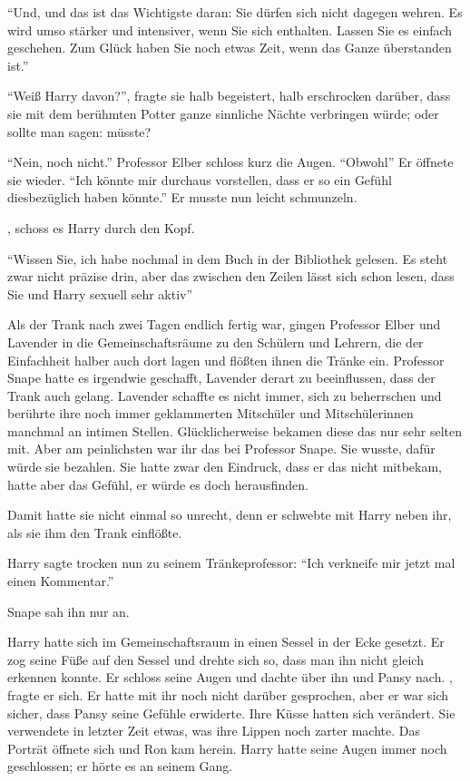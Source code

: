\enquote{Und, und das ist das Wichtigste daran: Sie dürfen sich nicht dagegen wehren. Es wird umso stärker und intensiver, wenn Sie sich enthalten. Lassen Sie es einfach geschehen. Zum Glück haben Sie noch etwas Zeit, wenn das Ganze überstanden ist.}

\enquote{Weiß Harry davon?}, fragte sie halb begeistert, halb erschrocken darüber, dass sie mit dem berühmten Potter ganze sinnliche Nächte verbringen würde; oder sollte man sagen: müsste?

\enquote{Nein, noch nicht.} Professor Elber schloss kurz die Augen. \enquote{Obwohl\abs} Er öffnete sie wieder. \enquote{Ich könnte mir durchaus vorstellen, dass er so ein Gefühl diesbezüglich haben könnte.} Er musste nun leicht schmunzeln.

, schoss es Harry durch den Kopf. 

\enquote{Wissen Sie, ich habe nochmal in dem Buch in der Bibliothek gelesen. Es steht zwar nicht präzise drin, aber das zwischen den Zeilen lässt sich schon lesen, dass Sie und Harry sexuell sehr aktiv\abs}

Als der Trank nach zwei Tagen endlich fertig war, gingen Professor Elber und Lavender in die Gemeinschaftsräume zu den Schülern und Lehrern, die der Einfachheit halber auch dort lagen und flößten ihnen die Tränke ein. Professor Snape hatte es irgendwie geschafft, Lavender derart zu beeinflussen, dass der Trank auch gelang. Lavender schaffte es nicht immer, sich zu beherrschen und berührte ihre noch immer geklammerten Mitschüler und Mitschülerinnen manchmal an intimen Stellen. Glücklicherweise bekamen diese das nur sehr selten mit. Aber am peinlichsten war ihr das bei Professor Snape. Sie wusste, dafür würde sie bezahlen. Sie hatte zwar den Eindruck, dass er das nicht mitbekam, hatte aber das Gefühl, er würde es doch herausfinden.

Damit hatte sie nicht einmal so unrecht, denn er schwebte mit Harry neben ihr, als sie ihm den Trank einflößte.

Harry sagte trocken nun zu seinem Tränkeprofessor: \enquote{Ich verkneife mir jetzt mal einen Kommentar.}

Snape sah ihn nur an.

\trenn

Harry hatte sich im Gemeinschaftsraum in einen Sessel in der Ecke gesetzt. Er zog seine Füße auf den Sessel und drehte sich so, dass man ihn nicht gleich erkennen konnte. Er schloss seine Augen und dachte über ihn und Pansy nach. , fragte er sich. Er hatte mit ihr noch nicht darüber gesprochen, aber er war sich sicher, dass Pansy seine Gefühle erwiderte. Ihre Küsse hatten sich verändert. Sie verwendete in letzter Zeit etwas, was ihre Lippen noch zarter machte. Das Porträt öffnete sich und Ron kam herein. Harry hatte seine Augen immer noch geschlossen; er hörte es an seinem Gang.

